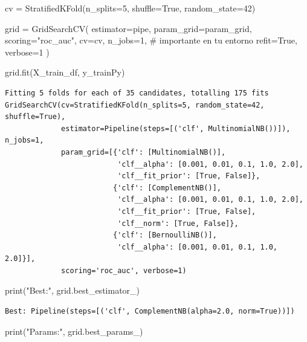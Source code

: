 \documentclass[
  letterpaper,
  DIV=11,
  numbers=noendperiod]{scrartcl}
\newenvironment{Shaded}{\begin{snugshade}}{\end{snugshade}}
\newcommand{\BuiltInTok}[1]{\textcolor[rgb]{0.00,0.23,0.31}{#1}}
\newcommand{\CommentTok}[1]{\textcolor[rgb]{0.37,0.37,0.37}{#1}}
\newcommand{\DecValTok}[1]{\textcolor[rgb]{0.68,0.00,0.00}{#1}}
\newcommand{\NormalTok}[1]{\textcolor[rgb]{0.00,0.23,0.31}{#1}}
\newcommand{\OperatorTok}[1]{\textcolor[rgb]{0.37,0.37,0.37}{#1}}
\newcommand{\StringTok}[1]{\textcolor[rgb]{0.13,0.47,0.30}{#1}}
\newcommand{\VariableTok}[1]{\textcolor[rgb]{0.07,0.07,0.07}{#1}}
\begin{document}
\begin{Shaded}
\begin{Highlighting}[]
\NormalTok{cv }\OperatorTok{=}\NormalTok{ StratifiedKFold(n\_splits}\OperatorTok{=}\DecValTok{5}\NormalTok{, shuffle}\OperatorTok{=}\VariableTok{True}\NormalTok{, random\_state}\OperatorTok{=}\DecValTok{42}\NormalTok{)}

\NormalTok{grid }\OperatorTok{=}\NormalTok{ GridSearchCV(}
\NormalTok{    estimator}\OperatorTok{=}\NormalTok{pipe,}
\NormalTok{    param\_grid}\OperatorTok{=}\NormalTok{param\_grid,}
\NormalTok{    scoring}\OperatorTok{=}\StringTok{"roc\_auc"}\NormalTok{,}
\NormalTok{    cv}\OperatorTok{=}\NormalTok{cv,}
\NormalTok{    n\_jobs}\OperatorTok{=}\DecValTok{1}\NormalTok{,     }\CommentTok{\# importante en tu entorno}
\NormalTok{    refit}\OperatorTok{=}\VariableTok{True}\NormalTok{,}
\NormalTok{    verbose}\OperatorTok{=}\DecValTok{1}
\NormalTok{)}

\NormalTok{grid.fit(X\_train\_df, y\_trainPy)}
\end{Highlighting}
\end{Shaded}

\begin{verbatim}
Fitting 5 folds for each of 35 candidates, totalling 175 fits
GridSearchCV(cv=StratifiedKFold(n_splits=5, random_state=42, shuffle=True),
             estimator=Pipeline(steps=[('clf', MultinomialNB())]), n_jobs=1,
             param_grid=[{'clf': [MultinomialNB()],
                          'clf__alpha': [0.001, 0.01, 0.1, 1.0, 2.0],
                          'clf__fit_prior': [True, False]},
                         {'clf': [ComplementNB()],
                          'clf__alpha': [0.001, 0.01, 0.1, 1.0, 2.0],
                          'clf__fit_prior': [True, False],
                          'clf__norm': [True, False]},
                         {'clf': [BernoulliNB()],
                          'clf__alpha': [0.001, 0.01, 0.1, 1.0, 2.0]}],
             scoring='roc_auc', verbose=1)
\end{verbatim}

\begin{Shaded}
\begin{Highlighting}[]
\BuiltInTok{print}\NormalTok{(}\StringTok{"Best:"}\NormalTok{, grid.best\_estimator\_)}
\end{Highlighting}
\end{Shaded}

\begin{verbatim}
Best: Pipeline(steps=[('clf', ComplementNB(alpha=2.0, norm=True))])
\end{verbatim}

\begin{Shaded}
\begin{Highlighting}[]
\BuiltInTok{print}\NormalTok{(}\StringTok{"Params:"}\NormalTok{, grid.best\_params\_)}
\end{Highlighting}
\end{Shaded}
\end{document}
